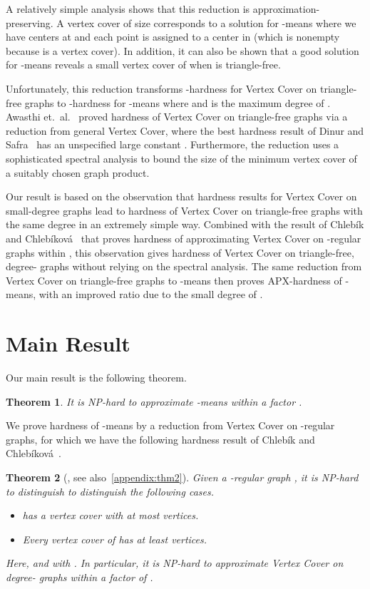 \documentclass{scrartcl}
\newtheorem{theorem}{Theorem}
\begin{document}
A relatively simple analysis shows that this reduction is approximation-preserving. 
A vertex cover  of size  corresponds to a solution for -means where we have centers at  and each point  is assigned to a center in  (which is nonempty because  is a vertex cover).  In addition, it can also be shown that a good solution for -means reveals a small vertex cover of  when  is triangle-free. 

Unfortunately, this reduction transforms -hardness for Vertex Cover on triangle-free graphs to -hardness for -means where  and  is the maximum degree of .
Awasthi et.\ al.~\cite{ACKS15} proved hardness of Vertex Cover on triangle-free graphs via a reduction from general Vertex Cover, where the best hardness result of Dinur and Safra~\cite{DS05} has an unspecified large constant . 
Furthermore, the reduction uses a sophisticated spectral analysis to bound the size of the minimum vertex cover of a suitably chosen graph product.

Our result is based on the observation that hardness results for Vertex Cover on small-degree graphs lead to hardness of Vertex Cover on triangle-free graphs with the same degree in an extremely simple way. 
Combined with the result of Chleb\'{i}k and Chleb\'{i}kov\'{a}~\cite{CC06} that proves hardness of approximating Vertex Cover on -regular graphs within , 
this observation gives hardness of Vertex Cover on triangle-free, degree- graphs without relying on the spectral analysis. 
The same reduction from Vertex Cover on triangle-free graphs to -means then proves APX-hardness of -means, with an improved ratio due to the small degree of . 

\section{Main Result}
Our main result is the following theorem.
\begin{theorem}
It is NP-hard to approximate -means within a factor . 
\end{theorem}

We prove hardness of -means by a reduction from Vertex Cover on -regular graphs, 
for which we have the following hardness result of Chleb\'{i}k and Chleb\'{i}kov\'{a}~\cite{CC06}.
\begin{theorem}[\cite{CC06}, see also~\ref{appendix:thm2}] 
Given a -regular graph , it is NP-hard to distinguish to distinguish the following cases.
\begin{itemize}
\item  has a vertex cover with at most  vertices. 
\item Every vertex cover of  has at least  vertices. 
\end{itemize}
Here,  and  with . In particular, it is NP-hard to approximate Vertex Cover on degree- graphs within a factor of . 
\end{theorem}
\end{document}
